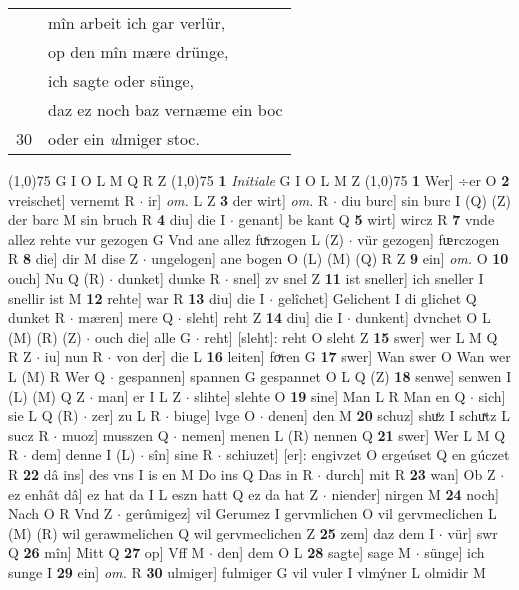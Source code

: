 \documentclass[8pt,a4paper,notitlepage]{article}
\begin{document}
\begin{table}[ht]
\begin{minipage}[t]{0.5\linewidth}
\begin{tabular}{rl}
 & mîn arbeit ich gar verlür,\\ 
 & op den mîn mære drünge,\\ 
 & ich sagte oder sünge,\\ 
 & daz ez noch baz vernæme ein boc\\ 
30 & oder ein \textit{u}lmiger stoc.\\ 
\end{tabular}
\scriptsize
\line(1,0){75} \newline
G I O L M Q R Z \newline
\line(1,0){75} \newline
\textbf{1} \textit{Initiale} G I O L M Z  \newline
\line(1,0){75} \newline
\textbf{1} Wer] ÷er O \textbf{2} vreischet] vernemt R  $\cdot$ ir] \textit{om.} L Z \textbf{3} der wirt] \textit{om.} R  $\cdot$ diu burc] sin burc I (Q) (Z) der barc M sin bruch R \textbf{4} diu] die I  $\cdot$ genant] be kant Q \textbf{5} wirt] wircz R \textbf{7} vnde allez rehte vur gezogen G Vnd ane allez fuͯrzogen L (Z)  $\cdot$ vür gezogen] fᵫrczogen R \textbf{8} die] dir M dise Z  $\cdot$ ungelogen] ane bogen O (L) (M) (Q) R Z \textbf{9} ein] \textit{om.} O \textbf{10} ouch] Nu Q (R)  $\cdot$ dunket] dunke R  $\cdot$ snel] zv snel Z \textbf{11} ist sneller] ich sneller I snellir ist M \textbf{12} rehte] war R \textbf{13} diu] die I  $\cdot$ gelîchet] Gelichent I di glichet Q dunket R  $\cdot$ mæren] mere Q  $\cdot$ sleht] reht Z \textbf{14} diu] die I  $\cdot$ dunkent] dvnchet O L (M) (R) (Z)  $\cdot$ ouch die] alle G  $\cdot$ reht] [sleht]: reht O sleht Z \textbf{15} swer] wer L M Q R Z  $\cdot$ iu] nun R  $\cdot$ von der] die L \textbf{16} leiten] foͮren G \textbf{17} swer] Wan swer O Wan wer L (M) R Wer Q  $\cdot$ gespannen] spannen G gespannet O L Q (Z) \textbf{18} senwe] senwen I (L) (M) Q Z  $\cdot$ man] er I L Z  $\cdot$ slihte] slehte O \textbf{19} sine] Man L R Man en Q  $\cdot$ sich] sie L Q (R)  $\cdot$ zer] zu L R  $\cdot$ biuge] lvge O  $\cdot$ denen] den M \textbf{20} schuz] shuͤz I schuͯtz L sucz R  $\cdot$ muoz] musszen Q  $\cdot$ nemen] menen L (R) nennen Q \textbf{21} swer] Wer L M Q R  $\cdot$ dem] denne I (L)  $\cdot$ sîn] sine R  $\cdot$ schiuzet] [er]: engivzet O ergeúset Q en gúczet R \textbf{22} dâ ins] des vns I is en M Do ins Q Das in R  $\cdot$ durch] mit R \textbf{23} wan] Ob Z  $\cdot$ ez enhât dâ] ez hat da I L eszn hatt Q ez da hat Z  $\cdot$ niender] nirgen M \textbf{24} noch] Nach O R Vnd Z  $\cdot$ gerûmigez] vil Gerumez I gervmlichen O vil gervmeclichen L (M) (R) wil gerawmelichen Q wil gervmeclichen Z \textbf{25} zem] daz dem I  $\cdot$ vür] swr Q \textbf{26} mîn] Mitt Q \textbf{27} op] Vff M  $\cdot$ den] dem O L \textbf{28} sagte] sage M  $\cdot$ sünge] ich sunge I \textbf{29} ein] \textit{om.} R \textbf{30} ulmiger] fulmiger G vil vuler I vlmýner L olmidir M \newline

\end{minipage}
\end{table}
\end{document}
